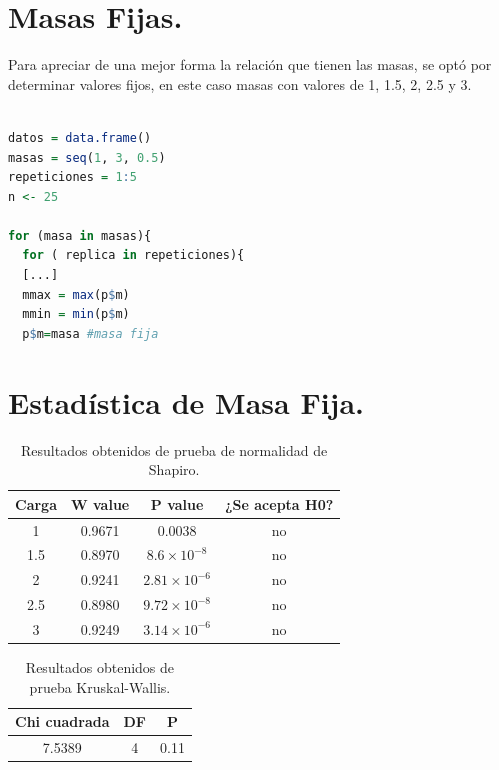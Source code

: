 \documentclass{article}
\begin{document}
\newpage
\section{Masas Fijas.}
Para apreciar de una mejor forma la relaci\'on que tienen las masas, se opt\'o por determinar valores fijos, en este caso masas con valores de 1, 1.5, 2, 2.5 y 3.

\begin{lstlisting}[language=R, caption= Segmento de c\'odigo - Masas Fijas.]

datos = data.frame()
masas = seq(1, 3, 0.5)
repeticiones = 1:5
n <- 25

for (masa in masas){
  for ( replica in repeticiones){
  [...]
  mmax = max(p$m) 
  mmin = min(p$m)
  p$m=masa #masa fija
\end{lstlisting}

\section{Estad\'istica de Masa Fija.}

\begin{table}[ht]
    \centering
    \caption{Resultados obtenidos de prueba de normalidad de Shapiro.} 
    \begin{tabular}{|c|c|c|c|}
    \hline
    Carga & W value & P value & ¿Se acepta H0?  \\
    \hline
    1 & 0.9671 & 0.0038 & no \\
    \hline
    1.5 & 0.8970 & $8.6\times 10^{-8}$ & no \\
    \hline
    2 & 0.9241 & $2.81\times 10^{-6}$ & no \\
    \hline
    2.5 & 0.8980 & $9.72\times 10^{-8}$ & no \\
    \hline
    3 & 0.9249 & $3.14\times 10^{-6}$ & no \\
    \hline
\end{tabular}
    \label{cuadro 1}
\end{table}

\begin{table}[ht]
    \centering
    \caption{Resultados obtenidos de prueba Kruskal-Wallis.} 
    \begin{tabular}{|c|c|c|}
    \hline
    Chi cuadrada & DF & P  \\
    \hline
    7.5389 & 4 & 0.11 \\
    \hline
\end{tabular}
    \label{cuadro 4}
\end{table}
\end{document}
